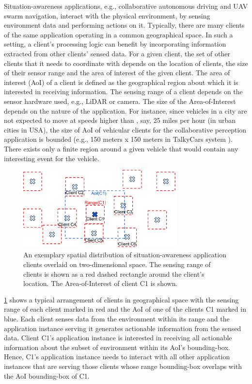 Situation-awareness applications, e.g., collaborative autonomous driving and UAV swarm navigation, interact with the physical environment, by sensing environment data and performing actions on it. Typically, there are many clients of the same application operating in a common geographical space. In such a setting, a client's processing logic can benefit by incorporating information extracted from other clients' sensed data. For a given client, the set of other clients that it needs to coordinate with depends on the location of clients, the size of their sensor range and the area of interest of the given client. The area of interest (AoI) of a client is defined as the geographical region about which it is interested in receiving information. The sensing range of a client depends on the sensor hardware used, e.g., LiDAR or camera. The size of the Area-of-Interest depends on the nature of the application. For instance, since vehicles in a city are not expected to move at speeds higher than , say, 25 miles per hour (in urban cities in USA), the size of AoI of vehicular clients for the collaborative perception application is bounded (e.g., 150 meters x 150 meters in TalkyCars system \cite{talkycars}). There exists only a finite region around a given vehicle that would contain any interesting event for the vehicle.
\begin{figure}
\centering
\includegraphics[width=0.75\textwidth]{figures/mechanisms/spatial_ctx_mgmt/aoi_range.pdf}
\caption{An exemplary spatial distribution of situation-awareness application clients overlaid on two-dimensional space. The sensing range of clients is shown as a red dashed rectangle around the client's location. The Area-of-Interest of client C1 is shown.}
\label{fig:aoi_range}
\end{figure}
\cref{fig:aoi_range} shows a typical arrangement of clients in geographical space with the sensing range of each client marked in red and the AoI of one of the clients C1 marked in blue. Each client senses data from the environment within its range and the application instance serving it generates actionable information from the sensed data. Client C1's application instance is interested in receiving all actionable information about the subset of environment within its AoI's bounding-box. Hence, C1's application instance needs to interact with all other application instances that are serving those clients whose range bounding-box overlaps with the AoI bounding-box of C1. 

